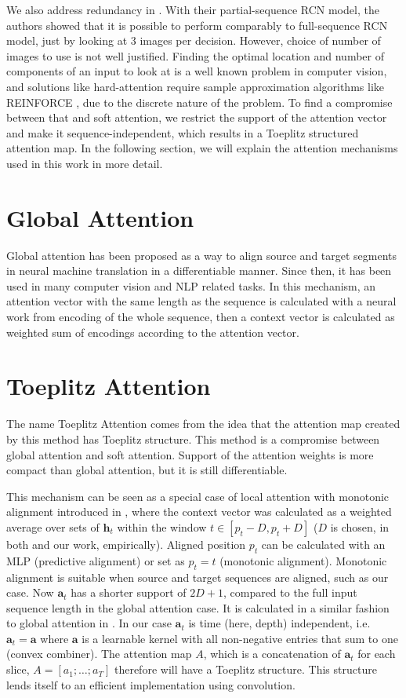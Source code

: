 \documentclass{article}
\begin{document}
We also address redundancy in  \cite{bozkurt2017delineation}. With their partial-sequence RCN model, the authors showed that it is possible to perform comparably to full-sequence RCN model, just by looking at 3 images per decision. However, choice of number of images to use is not well justified. Finding the optimal location and number of components of an input to look at is a well known problem \citep{mnih2014recurrent} in computer vision, and solutions like hard-attention require sample approximation algorithms like REINFORCE \cite{williams1992simple}, due to the discrete nature of the problem. To find a compromise between that and soft attention, we restrict the support of the attention vector and make it sequence-independent, which results in a Toeplitz structured attention map. In the following section, we will explain the attention mechanisms used in this work in more detail. 
\section{Global Attention}
Global attention \cite{bahdanau2014neural} has been proposed as a way to align source and target segments in neural machine translation in a differentiable manner. Since then, it has been used in many computer vision and NLP related tasks. In this mechanism, an attention vector with the same length as the sequence is calculated with a neural work from encoding of the whole sequence, then a context vector is calculated as weighted sum of encodings according to the attention vector. 

\section{Toeplitz Attention}
The name Toeplitz Attention comes from the idea that the attention map created by this method has Toeplitz structure. This method is a compromise between global attention and soft attention. Support of the attention weights is more compact than global attention, but it is still differentiable.

This mechanism can be seen as a special case of local attention with monotonic alignment introduced in \citet{luong2015effective}, where the context vector was calculated as a weighted average over sets of $\mathbf{h}_t$ within the window $t \in [p_t - D, p_t+D]$ ($D$ is chosen, in both \cite{luong2015effective} and our work, empirically). Aligned position $p_t$ can be calculated with an MLP (predictive alignment) or set as $p_t=t$ (monotonic alignment). Monotonic alignment is suitable when source and target sequences are aligned, such as our case. Now $\mathbf{a}_t$ has a shorter support of $2D+1$, compared to the full input sequence length in the global attention case. It is calculated in a similar fashion to global attention in \cite{luong2015effective}. In our case $\mathbf{a}_t$ is time (here, depth) independent, i.e. $\mathbf{a}_t=\mathbf{a}$ where $\mathbf{a}$ is a learnable kernel with all non-negative entries that sum to one (convex combiner). The attention map $A$, which is a concatenation of $\mathbf{a}_t$ for each slice, $A=[{a}_1;\ldots;{a}_T]$ therefore will have a Toeplitz structure. This structure lends itself to an efficient implementation using convolution.      
\end{document}
